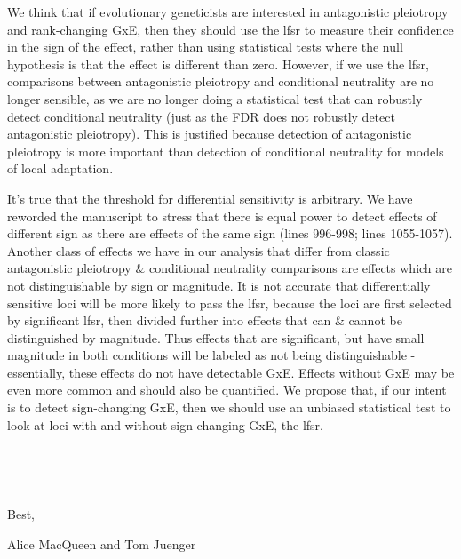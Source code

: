 \documentclass[
  letterpaper,
  DIV=11,
  numbers=noendperiod]{scrartcl}
\begin{document}
We think that if evolutionary geneticists are interested in antagonistic
pleiotropy and rank-changing GxE, then they should use the lfsr to
measure their confidence in the sign of the effect, rather than using
statistical tests where the null hypothesis is that the effect is
different than zero. However, if we use the lfsr, comparisons between
antagonistic pleiotropy and conditional neutrality are no longer
sensible, as we are no longer doing a statistical test that can robustly
detect conditional neutrality (just as the FDR does not robustly detect
antagonistic pleiotropy). This is justified because detection of
antagonistic pleiotropy is more important than detection of conditional
neutrality for models of local adaptation.

It's true that the threshold for differential sensitivity is arbitrary.
We have reworded the manuscript to stress that there is equal power to
detect effects of different sign as there are effects of the same sign
(lines 996-998; lines 1055-1057). Another class of effects we have in
our analysis that differ from classic antagonistic pleiotropy \&
conditional neutrality comparisons are effects which are not
distinguishable by sign or magnitude. It is not accurate that
differentially sensitive loci will be more likely to pass the lfsr,
because the loci are first selected by significant lfsr, then divided
further into effects that can \& cannot be distinguished by magnitude.
Thus effects that are significant, but have small magnitude in both
conditions will be labeled as not being distinguishable - essentially,
these effects do not have detectable GxE. Effects without GxE may be
even more common and should also be quantified. We propose that, if our
intent is to detect sign-changing GxE, then we should use an unbiased
statistical test to look at loci with and without sign-changing GxE, the
lfsr.

~

~

\begin{center}
Best,

\end{center}

\begin{flushright}
Alice MacQueen and Tom Juenger

\end{flushright}
\end{document}
